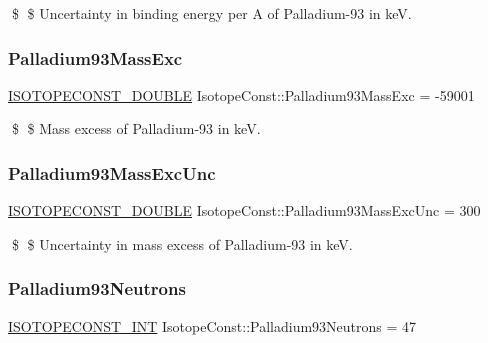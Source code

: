 \$ \$ Uncertainty in binding energy per A of Palladium-\/93 in keV. \mbox{\label{group___isotope_const-_palladium-_pd93_ga879569695843e6a7f2b037545846f21f}} 
\subsubsection{\texorpdfstring{Palladium93\+Mass\+Exc}{Palladium93MassExc}}
{\footnotesize\ttfamily \mbox{\hyperlink{group___isotope_const-_macros_ga8f45a7272ce02c0b4c65c44636ed719a}{I\+S\+O\+T\+O\+P\+E\+C\+O\+N\+S\+T\+\_\+\+D\+O\+U\+B\+LE}} Isotope\+Const\+::\+Palladium93\+Mass\+Exc = -\/59001}

\$ \$ Mass excess of Palladium-\/93 in keV. \mbox{\label{group___isotope_const-_palladium-_pd93_gabb1f242a839294ba1043fc100eb55d07}} 
\subsubsection{\texorpdfstring{Palladium93\+Mass\+Exc\+Unc}{Palladium93MassExcUnc}}
{\footnotesize\ttfamily \mbox{\hyperlink{group___isotope_const-_macros_ga8f45a7272ce02c0b4c65c44636ed719a}{I\+S\+O\+T\+O\+P\+E\+C\+O\+N\+S\+T\+\_\+\+D\+O\+U\+B\+LE}} Isotope\+Const\+::\+Palladium93\+Mass\+Exc\+Unc = 300}

\$ \$ Uncertainty in mass excess of Palladium-\/93 in keV. \mbox{\label{group___isotope_const-_palladium-_pd93_gae43e32fdca16441b94572cf927f86f2b}} 
\subsubsection{\texorpdfstring{Palladium93\+Neutrons}{Palladium93Neutrons}}
{\footnotesize\ttfamily \mbox{\hyperlink{group___isotope_const-_macros_ga5f18360b3e99483a35c32d789e62621c}{I\+S\+O\+T\+O\+P\+E\+C\+O\+N\+S\+T\+\_\+\+I\+NT}} Isotope\+Const\+::\+Palladium93\+Neutrons = 47}

